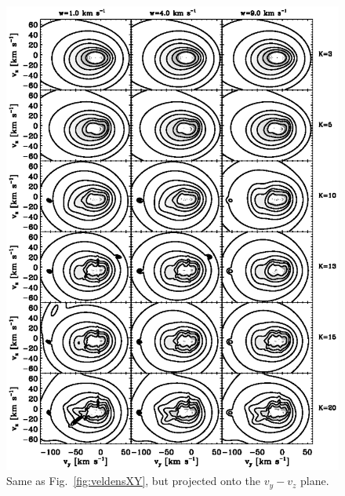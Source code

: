 \clearpage
\begin{figure}
\includegraphics{veldensYZ.ps}
\caption{Same as Fig.~\ref{fig:veldensXY}, but projected onto the $v_y-v_z$ plane.}%
\label{fig:veldensYZ}
\end{figure}


